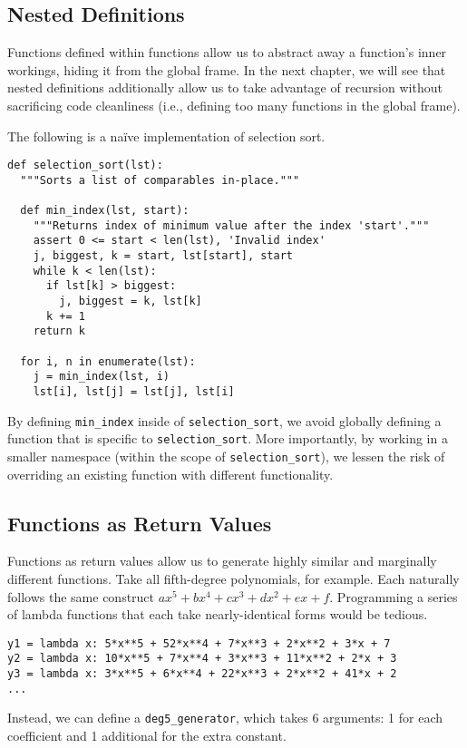 \documentclass[a4paper]{book}
\begin{document}
\subsection{Nested Definitions}

Functions defined within functions allow us to abstract away a function's inner workings, hiding it from the global frame. In the next chapter, we will see that nested definitions additionally allow us to take advantage of recursion without sacrificing code cleanliness (i.e., defining too many functions in the global frame).

\pagebreak

The following is a naïve implementation of selection sort.

\begin{lstlisting}
def selection_sort(lst):
  """Sorts a list of comparables in-place."""
  
  def min_index(lst, start):
    """Returns index of minimum value after the index 'start'."""
    assert 0 <= start < len(lst), 'Invalid index'
    j, biggest, k = start, lst[start], start
    while k < len(lst):
      if lst[k] > biggest:
        j, biggest = k, lst[k]
      k += 1
    return k
    
  for i, n in enumerate(lst):
    j = min_index(lst, i)
    lst[i], lst[j] = lst[j], lst[i]
\end{lstlisting}

By defining {\tt min\_index} inside of {\tt selection\_sort}, we avoid globally defining a function that is specific to {\tt selection\_sort}. More importantly, by working in a smaller namespace (within the scope of {\tt selection\_sort}), we lessen the risk of overriding an existing function with different functionality.  

\subsection{Functions as Return Values}

Functions as return values allow us to generate highly similar and marginally different functions. Take all fifth-degree polynomials, for example. Each naturally follows the same construct $ax^5 + bx^4 + cx^3 + dx^2 + ex + f$. Programming a series of lambda functions that each take nearly-identical forms would be tedious. 
\begin{lstlisting}
y1 = lambda x: 5*x**5 + 52*x**4 + 7*x**3 + 2*x**2 + 3*x + 7
y2 = lambda x: 10*x**5 + 7*x**4 + 3*x**3 + 11*x**2 + 2*x + 3
y3 = lambda x: 3*x**5 + 6*x**4 + 22*x**3 + 2*x**2 + 41*x + 2
...
\end{lstlisting}
Instead, we can define a {\tt deg5\_generator}, which takes 6 arguments: 1 for each coefficient and 1 additional for the extra constant.
\end{document}
